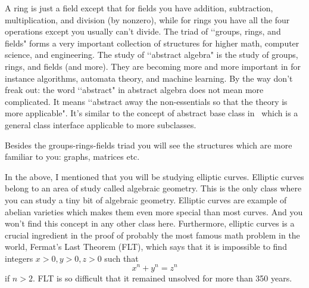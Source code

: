 \begin{itemize}
  \li
  A ring is just a field except that for fields you have
  addition, subtraction, multiplication, and division (by nonzero),
  while for rings you have all the four operations except you
  usually can't divide.
  The triad of \lq\lq groups, rings, and fields"
  forms a very important collection of structures for higher
  math, computer science, and engineering.
  The study of \lq\lq abstract algebra" is the study
  of groups, rings, and fields (and more).
  They are becoming more and more important in for instance
  algorithms, automata theory,
  and machine learning.
  By the way don't freak out: the word \lq\lq abstract" in abstract algebra
  does not mean more complicated.
  It means \lq\lq abstract away the non-essentials so that the
  theory is more applicable".
  It's similar to the concept of abstract base class in \cpp\ which is
  a general class interface applicable to more subclasses.

  \li
  Besides the groups-rings-fields triad you will see
  the structures which are more familiar to you:  
  graphs, matrices etc.

  \li
  In the above, I mentioned that you will be studying elliptic curves.
  Elliptic curves belong to an area of study called algebraic geometry.
  This is the only class where you can study a tiny bit of algebraic geometry.
  Elliptic curves are example of abelian varieties which makes
  them even more special than most curves. And you won't
  find this concept in any other class here.
  Furthermore, elliptic curves is a crucial ingredient in the proof of
  probably the most famous math problem in the world,
  Fermat's Last Theorem (FLT),
  which says that it is impossible to find integers $x > 0, y > 0, z > 0$
  such that
  \[
  x^n + y^n = z^n
  \]
  if $n > 2$. FLT is so difficult that it remained unsolved
  for more than 350 years.
  

\end{itemize}
